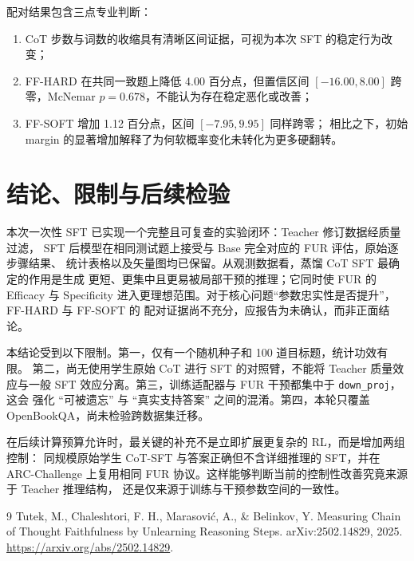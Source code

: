 \documentclass[UTF8,fontset=fandol,10pt,a4paper]{ctexart}
\begin{document}
配对结果包含三点专业判断：
\begin{enumerate}
    \item CoT 步数与词数的收缩具有清晰区间证据，可视为本次 SFT 的稳定行为改变；
    \item FF-HARD 在共同一致题上降低 4.00 百分点，但置信区间
    $[-16.00,8.00]$ 跨零，McNemar $p=0.678$，不能认为存在稳定恶化或改善；
    \item FF-SOFT 增加 1.12 百分点，区间 $[-7.95,9.95]$ 同样跨零；
    相比之下，初始 margin 的显著增加解释了为何软概率变化未转化为更多硬翻转。
\end{enumerate}

\section{结论、限制与后续检验}

本次一次性 SFT 已实现一个完整且可复查的实验闭环：Teacher 修订数据经质量过滤，
SFT 后模型在相同测试题上接受与 Base 完全对应的 FUR 评估，原始逐步骤结果、
统计表格以及矢量图均已保留。从观测数据看，蒸馏 CoT SFT 最确定的作用是生成
更短、更集中且更易被局部干预的推理；它同时使 FUR 的 Efficacy 与 Specificity
进入更理想范围。对于核心问题``参数忠实性是否提升''，FF-HARD 与 FF-SOFT 的
配对证据尚不充分，应报告为未确认，而非正面结论。

本结论受到以下限制。第一，仅有一个随机种子和 100 道目标题，统计功效有限。
第二，尚无使用学生原始 CoT 进行 SFT 的对照臂，不能将 Teacher 质量效应与一般
SFT 效应分离。第三，训练适配器与 FUR 干预都集中于 \texttt{down\_proj}，这会
强化 ``可被遗忘'' 与 ``真实支持答案'' 之间的混淆。第四，本轮只覆盖
OpenBookQA，尚未检验跨数据集迁移。

在后续计算预算允许时，最关键的补充不是立即扩展更复杂的 RL，而是增加两组控制：
同规模原始学生 CoT-SFT 与答案正确但不含详细推理的 SFT，并在 ARC-Challenge
上复用相同 FUR 协议。这样能够判断当前的控制性改善究竟来源于 Teacher 推理结构，
还是仅来源于训练与干预参数空间的一致性。

\begin{thebibliography}{9}
Tutek, M., Chaleshtori, F. H., Marasović, A., \& Belinkov, Y.
\newblock Measuring Chain of Thought Faithfulness by Unlearning Reasoning Steps.
\newblock arXiv:2502.14829, 2025.
\newblock \url{https://arxiv.org/abs/2502.14829}.
\end{thebibliography}
\end{document}
